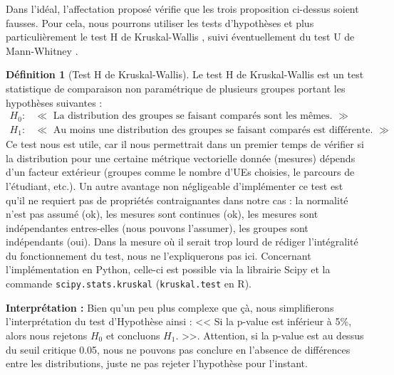 \documentclass{rapport}
\theoremstyle{definition}
\newtheorem{definition}{Définition}
\theoremstyle{remark}
\theoremstyle{plain}
\theoremstyle{definition}
\theoremstyle{remark}
\begin{document}
Dans l'idéal, l'affectation proposé vérifie que les trois proposition ci-dessus soient fausses. Pour cela, nous pourrons utiliser les tests d'hypothèses et plus particulièrement le test H de Kruskal-Wallis \cite{Kruskal1952}, suivi éventuellement du test U de Mann-Whitney \cite{Whitney1947}. 
\begin{definition}[Test H de Kruskal-Wallis]
    Le test H de Kruskal-Wallis est un test statistique de comparaison non paramétrique de plusieurs groupes portant les hypothèses suivantes :
    $$
    \begin{matrix}
        H_0 : & \ll\text{ La distribution des groupes se faisant comparés sont les mêmes. } \gg\\
        H_1 : & \ll\text{ Au moins une distribution des groupes se faisant comparés est différente. }\gg
    \end{matrix}
    $$
    Ce test nous est utile, car il nous permettrait dans un premier temps de vérifier si la distribution pour une certaine métrique vectorielle donnée (mesures) dépends d'un facteur extérieur (groupes comme le nombre d'UEs choisies, le parcours de l'étudiant, etc.). 
    Un autre avantage non négligeable d'implémenter ce test est qu'il ne requiert pas de propriétés contraignantes dans notre cas : la normalité n'est pas assumé (ok), les mesures sont continues (ok), les mesures sont indépendantes entres-elles (nous pouvons l'assumer), les groupes sont indépendants (oui).
    Dans la mesure où il serait trop lourd de rédiger l'intégralité du fonctionnement du test, nous ne l'expliquerons pas ici. Concernant l'implémentation en Python, celle-ci est possible via la librairie Scipy et la commande \texttt{scipy.stats.kruskal} (\texttt{kruskal.test} en R).

    \textbf{Interprétation :} Bien qu'un peu plus complexe que çà, nous simplifierons l'interprétation du test d'Hypothèse ainsi : << Si la p-value est inférieur à 5\%, alors nous rejetons $H_0$ et concluons $H_1$. >>. Attention, si la p-value est au dessus du seuil critique 0.05, nous ne pouvons pas conclure en l'absence de différences entre les distributions, juste ne pas rejeter l'hypothèse pour l'instant.
\end{definition}
\end{document}
